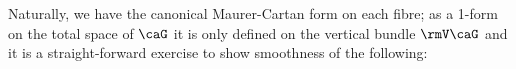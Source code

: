 \documentclass[reqno,a4paper,oneside]{amsart}
\newcommand\MC{\mu_{{\rm MC}}}
\theoremstyle{plain}
\theoremstyle{remark}
\theoremstyle{definition}
\def\bas#1\eas{\begin{align*}#1\end{align*}}
\begin{document}
Naturally, we have the canonical Maurer-Cartan form on each fibre; as a 1-form on the total space of $\caG$ it is only defined on the vertical bundle $\rmV\caG$ and it is a straight-forward exercise to show smoothness of the following:
%
%
\end{document}
